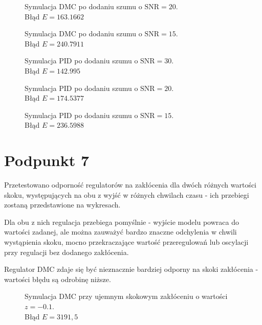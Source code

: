 \begin{figure}[ht]
\centering

\caption{Symulacja DMC po dodaniu szumu o $ \mathrm{SNR}=20 $.\\Błąd $ E = \num{163,1662} $}
\label{Z6b}
\end{figure}

\begin{figure}[ht]
\centering

\caption{Symulacja DMC po dodaniu szumu o $ \mathrm{SNR}=15 $.\\Błąd $ E = \num{240,7911} $}
\label{Z6c}
\end{figure}

\begin{figure}[ht]
\centering

\caption{Symulacja PID po dodaniu szumu o $ \mathrm{SNR}=30 $.\\Błąd $ E = \num{142,995} $}
\label{Z6d}
\end{figure}

\begin{figure}[ht]
\centering

\caption{Symulacja PID po dodaniu szumu o $ \mathrm{SNR}=20 $.\\Błąd $ E = \num{174,5377} $}
\label{Z6e}
\end{figure}

\begin{figure}[ht]
\centering

\caption{Symulacja PID po dodaniu szumu o $ \mathrm{SNR}=15 $.\\Błąd $ E = \num{236,5988} $}
\label{Z6f}
\end{figure}

\chapter{Podpunkt 7}
Przetestowano odporność regulatorów na zakłócenia dla dwóch różnych wartości skoku, występujących na obu z wyjść w różnych chwilach czasu - ich przebiegi zostaną przedstawione na wykresach.

Dla obu z nich regulacja przebiega pomyślnie - wyjście modelu powraca do wartości zadanej, ale można zauważyć bardzo znaczne odchylenia w chwili wystąpienia skoku, mocno przekraczające wartość przeregulowań lub oscylacji przy regulacji bez dodanego zakłócenia. 

Regulator DMC zdaje się być nieznacznie bardziej odporny na skoki zakłócenia - wartości błędu są odrobinę niższe.

\begin{figure}[ht]
\centering

\caption{Symulacja DMC przy ujemnym skokowym zakłóceniu o wartości $ z=\num{-0,1}$.\\Błąd $ E=3191,5 $ }
\label{Z7a}
\end{figure}

